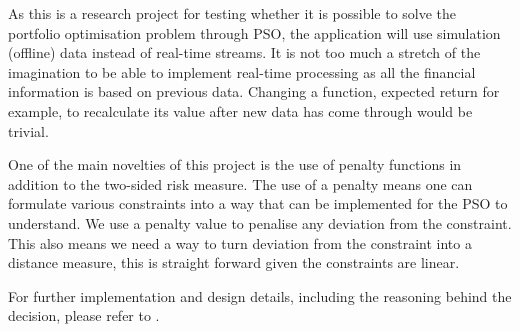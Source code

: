   As this is a research project for testing whether it is possible to solve the portfolio optimisation problem through PSO, the application will use simulation (offline) data instead of real-time streams. It is not too much a stretch of the imagination to be able to implement real-time processing as all the financial information is based on previous data. Changing a function, expected return for example, to recalculate its value after new data has come through would be trivial. 

  One of the main novelties of this project is the use of penalty functions in addition to the two-sided risk measure. The use of a penalty means one can formulate various constraints into a way that can be implemented for the PSO to understand. We use a penalty value to penalise any deviation from the constraint. This also means we need a way to turn deviation from the constraint into a distance measure, this is straight forward given the constraints are linear. 

  For further implementation and design details, including the reasoning behind the decision, please refer to .

